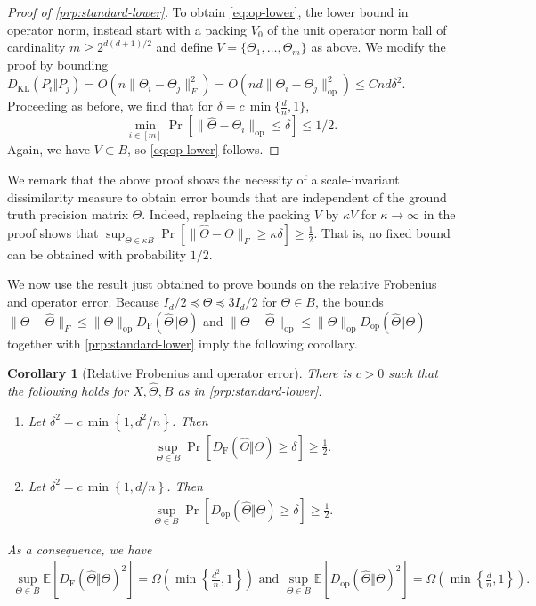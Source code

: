 \documentclass[aos]{imsart}
\newtheorem{corollary}[theorem]{Corollary}
\theoremstyle{definition}
\numberwithin{equation}{section}
\DeclareMathOperator{\op}{op}
\newcommand{\htheta}{\widehat{\Theta}}
\newcommand{\E}{\mathbb{E}}
\newcommand{\DF}{D_{\operatorname{F}}}
\newcommand{\Dop}{D_{\operatorname{op}}}
\newcommand{\DKL}{D_{\operatorname{KL}}}
\begin{document}
\begin{proof}[Proof of \cref{prp:standard-lower}]
To obtain \cref{eq:op-lower}, the lower bound in operator norm, instead start with a packing $V_0$ of the unit operator norm ball of cardinality $m \geq 2^{d(d+1)/2}$ and define $V = \{ \Theta_1, \dots, \Theta_m \}$ as above.
We modify the proof by bounding $\DKL(P_i \Vert  P_j) = O(n \| \Theta_i - \Theta_j\|_F^2) = O(n d \|\Theta_i - \Theta_j\|_{\op}^2) \leq C nd \delta^2.$
Proceeding as before, we find that for $\delta = c \, \min \{\frac{d}{n}, 1\}$,
\[ \min_{i \in [m]} \Pr\left[ \|\htheta - \Theta_i\|_{\op} \leq \delta\right] \leq 1/2. \]
Again, we have $V \subset B$, so \cref{eq:op-lower} follows.
\end{proof}

We remark that the above proof shows the necessity of a scale-invariant dissimilarity measure to obtain error bounds that are independent of the ground truth precision matrix $\Theta$.
Indeed, replacing the packing $V$ by $\kappa V$ for $\kappa \to \infty$ in the proof shows that $\sup_{\Theta \in \kappa B} \Pr[ \| \htheta - \Theta\|_F \geq \kappa \delta ] \geq \frac{1}{2}$.
That is, no fixed bound can be obtained with probability $1/2$.

We now use the result just obtained to prove bounds on the relative Frobenius and operator error. Because $I_d/2 \preceq \Theta \preceq 3I_d/2$ for $\Theta \in B$, the bounds $\|\Theta - \htheta\|_F \leq \|\Theta\|_{\op} \DF(\htheta\Vert  \Theta)$ and $\|\Theta - \htheta\|_{\op} \leq \|\Theta\|_{\op} \Dop(\htheta\Vert  \Theta)$ together with \cref{prp:standard-lower} imply the following corollary.
\begin{corollary}[Relative Frobenius and operator error]\label{prp:relative-lower}
There is $c > 0$ such that the following holds for $X, \htheta, B$ as in \cref{prp:standard-lower}.
\begin{enumerate}
\item Let $\delta^2 = c \, \min \left\{1,d^2/n\right\}$. Then
\begin{align}
\sup_{\Theta \in B} \Pr\left[ \DF(\htheta\Vert  \Theta)  \geq \delta\right] \geq \frac{1}{2}.\label{eq:df-lower}
\end{align}
\item Let $\delta^2 = c \, \min \left\{1,d/n\right\}$. Then
 \begin{align}
\sup_{\Theta \in B} \Pr\left[ \Dop(\htheta\Vert  \Theta) \geq \delta\right] \geq \frac{1}{2}. \label{eq:dop-lower}
\end{align}
\end{enumerate}
As a consequence, we have
\begin{align*}
\sup_{\Theta \in B}\E[\DF(\htheta\Vert  \Theta)^2] =\Omega\left( \min \left\{\frac{d^2}{n},1\right\}\right)
\text{ and }
\sup_{\Theta \in B}\E[\Dop(\htheta\Vert  \Theta)^2] = \Omega\left( \min \left\{\frac{d}{n},1\right\}\right).
\end{align*}
\end{corollary}
\end{document}

